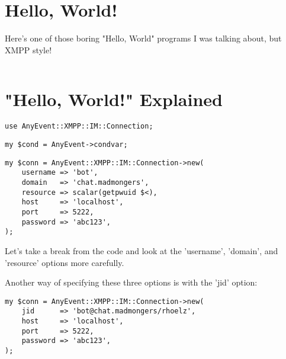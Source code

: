 \section{Hello, World!}

\pause

Here's one of those boring "Hello, World" programs I was talking about, but XMPP style!

\begin{shaded}
\inputminted{perl}{examples/hello.pl}
\end{shaded}

\newpage
\section{"Hello, World!" Explained}

\pause

\begin{shaded}
\begin{verbatim}
use AnyEvent::XMPP::IM::Connection;
\end{verbatim}
\end{shaded}

\pause
\begin{shaded}
\begin{verbatim}
my $cond = AnyEvent->condvar;
\end{verbatim}
\end{shaded}

\pause
\begin{shaded}
\begin{verbatim}
my $conn = AnyEvent::XMPP::IM::Connection->new(
    username => 'bot',
    domain   => 'chat.madmongers',
    resource => scalar(getpwuid $<),
    host     => 'localhost',
    port     => 5222,
    password => 'abc123',
);
\end{verbatim}
\end{shaded}

\pause
Let's take a break from the code and look at the 'username', 'domain', and
'resource' options more carefully.

\pause
Another way of specifying these three options is with the 'jid' option:

\begin{shaded}
\begin{verbatim}
my $conn = AnyEvent::XMPP::IM::Connection->new(
    jid      => 'bot@chat.madmongers/rhoelz',
    host     => 'localhost',
    port     => 5222,
    password => 'abc123',
);
\end{verbatim}
\end{shaded}

